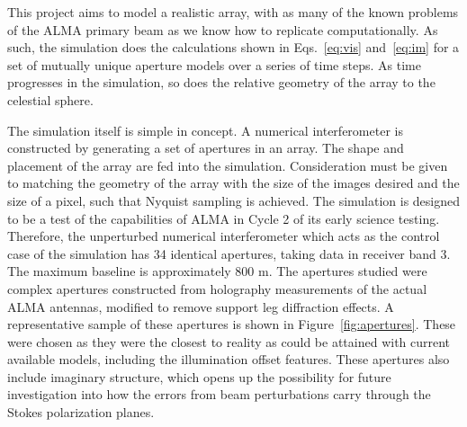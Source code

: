 \documentclass[11pt]{article}
\begin{document}
This project aims to model a realistic array, with as many of the known 
problems of the ALMA primary beam as we know how to replicate computationally.  
As such, the simulation does the calculations shown in Eqs.~\eqref{eq:vis} 
and~\eqref{eq:im} for a set of mutually unique aperture models over a series of 
time steps. As time progresses in the simulation, so does the relative geometry 
of the array to the celestial sphere.

The simulation itself is simple in concept. A numerical interferometer is 
constructed by generating a set of apertures in an array. The shape and 
placement of the array are fed into the simulation. Consideration must be given 
to matching the geometry of the array with the size of the images desired and 
the size of a pixel, such that Nyquist sampling is achieved. The simulation is 
designed to be a test of the capabilities of ALMA in Cycle 2 of its early 
science testing. Therefore, the unperturbed numerical interferometer which acts 
as the control case of the simulation has 34 identical apertures, taking data 
in receiver band 3. The maximum baseline is approximately 800 m.
The apertures studied were complex apertures constructed from holography 
measurements of the actual ALMA antennas, modified to remove support leg 
diffraction effects. A representative sample of these apertures is shown in
Figure~\ref{fig:apertures}. These were chosen as they were the closest to 
reality as could be attained with current available models, including the 
illumination offset features. These apertures also include imaginary structure, 
which opens up the possibility for future investigation into how the
errors from beam perturbations carry through the Stokes polarization planes.
\end{document}
